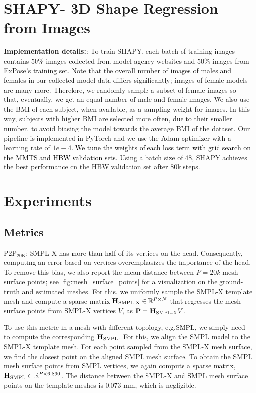 \documentclass[10pt,twocolumn,letterpaper]{article}
\newcommand{\qheading}[1]{\noindent\textbf{#1}:}
\newcommand{\modelCOLOR}{black}
\newcommand{\modelname}{{\color{\modelCOLOR}SHAPY}\xspace}
\newcommand{\expose}{\mbox{ExPose}\xspace}
\newcommand{\threeD}{3D\xspace}
\newcommand{\mmts}{MMTS\xspace}
\newcommand{\hbw}{\mbox{HBW}\xspace}
\newcommand{\smplx}{\mbox{SMPL-X}\xspace}
\newcommand{\groundtruth}{\mbox{ground-truth}\xspace}
\newcommand{\smpl}{\mbox{SMPL}\xspace}
\newcommand{\nverticessmpl}{6,890\xspace}
\newcommand{\npointshd}{20k\xspace}
\renewcommand{\eg}{\mbox{e.g.}\xspace}
\newcommand{\vtovHD}{\mbox{$\text{P2P}_{20\text{K}}$}\xspace}
\newcommand{\sparseregressor}{\mathbf{H}}
\newcommand{\sparseregressorsmplx}{\sparseregressor_{\text{\smplx}}}
\newcommand{\sparseregressorsmpl}{\sparseregressor_{\text{\smpl}}}
\newcommand{\cameraready}[1]{\textcolor{Fuchsia}{{#1}}\xspace}
\renewcommand{\cameraready}[1]{\textcolor{black}{{#1}}\xspace}
\begin{document}
\begin{appendices}
\section{\modelname - \threeD Shape Regression from Images}
\qheading{Implementation details:}
To train \modelname,
each batch of training images contains 
$50\%$ images collected from model agency websites and 
$50\%$ images from \expose{'s} \cite{Choutas2020_expose} training set.
Note that the overall number of images of males and females in our collected model data differs significantly; images of female models are many more.
Therefore, we randomly sample a subset of female images so that, eventually, we get an equal number of male and female images.
We also use the BMI of each subject, when available, as a sampling weight for images. 
In this way, subjects with higher BMI are selected more often, due to their smaller number,
to avoid biasing the model towards the average BMI of the dataset.
Our pipeline is implemented in PyTorch \cite{pytorch} and we use the Adam \cite{adam} optimizer with a learning rate of $1e-4$.
\cameraready{We tune the weights of each loss term with
grid search on the \mmts and \hbw validation sets.}
Using a batch size of $48$, \modelname achieves the best performance on the \hbw validation set after 80k steps. 
 
\section{Experiments}

\subsection{Metrics} \label{supmat:sec:metrics}

\qheading{\vtovHD}
\smplx has more than half of its vertices on the head.
Consequently, computing an error based on vertices
overemphasizes
the importance of the head.
To remove this bias, we also report the mean distance between $P=\npointshd$ mesh surface points; see \cref{fig:mesh_surface_points} for a visualization on the \groundtruth and estimated meshes.
For this, we uniformly sample the \smplx template mesh and
compute a sparse matrix $\sparseregressorsmplx \in \mathbb{R}^{P \times N}$
that regresses the mesh surface points from \smplx vertices $V$,
as $\mathbf{P} = \sparseregressorsmplx V$.

To use this metric in a mesh with different topology, \eg \smpl,
we simply need to compute the corresponding $\sparseregressorsmpl$.
For this, we align the \smpl model to the \smplx template mesh.
For each point sampled from the \smplx mesh surface,
we find the closest point on the aligned \smpl mesh surface.
To obtain the \smpl mesh surface points from \smpl vertices,
we again compute a sparse matrix, $\sparseregressorsmpl \in \mathbb{R}^{P \times \nverticessmpl}$.
The distance between the \smplx and \smpl mesh surface points on the template meshes is $0.073$ mm,
which is negligible.


\end{appendices}
\end{document}
